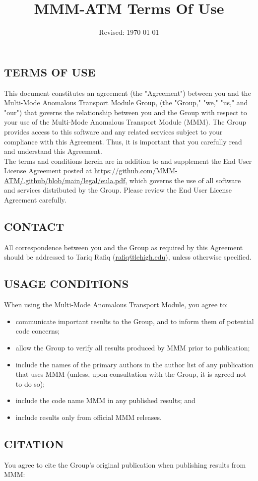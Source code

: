 \documentclass[11pt]{article}
\title{MMM-ATM Terms Of Use\vspace{-\baselineskip}}
\date{Revised: \today}
\begin{document}
\maketitle

\subsection*{TERMS OF USE}

This document constitutes an agreement (the "Agreement") between you and the Multi-Mode Anomalous Transport Module Group, (the "Group," "we," "us," and "our") that governs the relationship between you and the Group with respect to your use of the Multi-Mode Anomalous Transport Module (MMM). The Group provides access to this software and any related services subject to your compliance with this Agreement. Thus, it is important that you carefully read and understand this Agreement.\\[\baselineskip]
The terms and conditions herein are in addition to and supplement the End User License Agreement posted at \href{https://github.com/MMM-ATM/.github/blob/main/legal/eula.pdf}{https://github.com/MMM-ATM/.github/blob/main/legal/eula.pdf}, which governs the use of all software and services distributed by the Group. Please review the End User License Agreement carefully.

\subsection*{CONTACT}

All correspondence between you and the Group as required by this Agreement should be addressed to Tariq Rafiq (\href{mailto:rafiq@lehigh.edu}{rafiq@lehigh.edu}), unless otherwise specified.

\subsection*{USAGE CONDITIONS}

When using the Multi-Mode Anomalous Transport Module, you agree to:
\begin{itemize}
    \item communicate important results to the Group, and to inform them of potential code concerns;
    \item allow the Group to verify all results produced by MMM prior to publication;
    \item include the names of the primary authors in the author list of any publication that uses MMM (unless, upon consultation with the Group, it is agreed not to do so);
    \item include the code name MMM in any published results; and
    \item include results only from official MMM releases.
\end{itemize}

\subsection*{CITATION}
You agree to cite the Group's original publication \cite{doi:10.1063/1.4794288} when publishing results from MMM:

\end{document}
